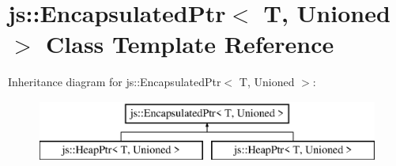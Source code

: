 \hypertarget{classjs_1_1_encapsulated_ptr}{\section{js\-:\-:Encapsulated\-Ptr$<$ T, Unioned $>$ Class Template Reference}
\label{classjs_1_1_encapsulated_ptr}
}
Inheritance diagram for js\-:\-:Encapsulated\-Ptr$<$ T, Unioned $>$\-:\begin{figure}[H]
\begin{center}
\leavevmode
\includegraphics[height=2.000000cm]{classjs_1_1_encapsulated_ptr}
\end{center}
\end{figure}
